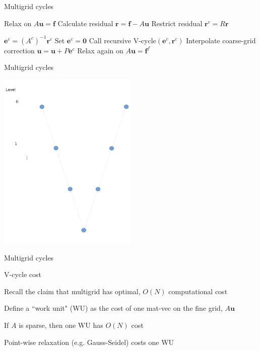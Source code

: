 \documentclass[18pt,xcolor=table]{beamer}
\begin{document}
\begin{frame}{Multigrid cycles}

\begin{algorithm}[H]
\caption{Recursive V-cycle$(\mathbf{u},\mathbf{f})$}
\begin{algorithmic}
\State Relax on $A\mathbf{u} = \mathbf{f}$
\State Calculate residual $\mathbf{r} = \mathbf{f} - A\mathbf{u}$
\State Restrict residual $\mathbf{r}^c = R\mathbf{r}$

\State $\mathbf{e}^c = (A^c)^{-1}\mathbf{r}^c$
\Else
\State Set $\mathbf{e}^c = \mathbf{0}$
\State Call recursive V-cycle$(\mathbf{e}^c, \mathbf{r}^c)$
\EndIf
\State Interpolate coarse-grid correction $\mathbf{u} = \mathbf{u} + P\mathbf{e}^c$
\State Relax again on $A\mathbf{u} = \mathbf{f}^f$
\end{algorithmic}
\end{algorithm}
\end{frame}

\begin{frame}{Multigrid cycles}
\begin{center}
\hspace{-1cm}
\includegraphics[width=0.5\textwidth]{../figures/Vcycle}
\end{center}
\end{frame}

\begin{frame}{Multigrid cycles}
\begin{block}{V-cycle cost}
\bit
\item Recall the claim that multigrid has optimal, $O(N)$ computational cost
\item Define a ``work unit" (WU) as the cost of one mat-vec on the fine grid, $A\mathbf{u}$
\item If $A$ is sparse, then one WU has $O(N)$ cost
\item Point-wise relaxation (e.g. Gauss-Seidel) costs one WU
\eit
\end{block}
\end{frame}
\end{document}
